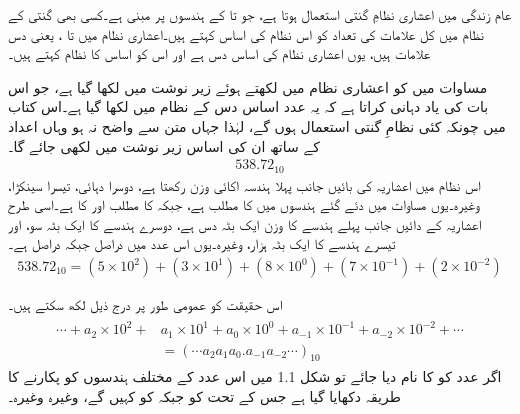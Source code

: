 

عام زندگی میں اعشاری نظامِ گنتی  استعمال ہوتا ہے،  جو   تا   کے ہندسوں پر مبنی ہے۔کسی بھی گنتی کے نظام میں کل علامات کی تعداد کو اس نظام کی  اساس  کہتے ہیں۔اعشاری نظام   میں  تا ،  یعنی دس  علامات ہیں، یوں اعشاری نظام کی  اساس دس ہے اور اس  کو اساس   کا نظام کہتے ہیں۔

	مساوات   میں    کو  اعشاری نظام میں لکھتے ہوئے زیر نوشت  میں    لکھا گیا ہے، جو  اس بات کی یاد دہانی کراتا ہے کہ یہ عدد  اساس دس کے نظام میں لکھا گیا ہے۔اس کتاب میں چونکہ کئی نظامِ گنتی استعمال ہوں گے،  لہٰذا جہاں متن سے واضح نہ ہو وہاں اعداد کے ساتھ ان کی  اساس زیر نوشت میں لکھی  جائے گا۔
\begin{align}\label{مساوات_ثنائی_عدد}
538.72_{10}
\end{align}
اس نظام میں اعشاریہ کی بائیں جانب پہلا ہندسہ اکائی وزن رکھتا ہے، دوسرا دہائی، تیسرا سینکڑا،  وغیرہ۔یوں مساوات    میں  دئے گئے ہندسوں میں     کا 
مطلب     ہے،  جبکہ       کا مطلب      اور     کا      ہے۔اسی طرح اعشاریہ کے دائیں جانب پہلے  ہندسے   کا وزن ایک بٹہ دس ہے، دوسرے  ہندسے  کا ایک بٹہ سو،  اور تیسرے ہندسے کا ایک بٹہ ہزار،  وغیرہ۔یوں  اس عدد میں    دراصل    جبکہ    دراصل    ہے۔
\begin{align}\label{مساوات_ثنائی_سینکڑا}
538.72_{10}=(5\times 10^2)+(3\times 10^1)+(8\times 10^0)+(7\times 10^{-1})+(2\times 10^{-2})
\end{align}

اس حقیقت  کو عمومی طور پر درج ذیل  لکھ سکتے ہیں۔
\begin{gather}
\begin{aligned}
\cdots+a_2\times 10^2+&a_1\times 10^1+a_0\times 10^0+a_{-1}\times 10^{-1}+a_{-2}\times 10^{-2}+\cdots\\
&=(\cdots a_2a_1a_0.a_{-1}a_{-2}\cdots)_{10}
\end{aligned}
\end{gather}
	اگر عدد   کو   کا نام دیا جائے تو شکل 1.1  میں اس عدد کے مختلف ہندسوں کو پکارنے کا طریقہ دکھایا گیا ہے جس کے تحت   کو   جبکہ    کو  کہیں گے، وغیرہ وغیرہ۔

